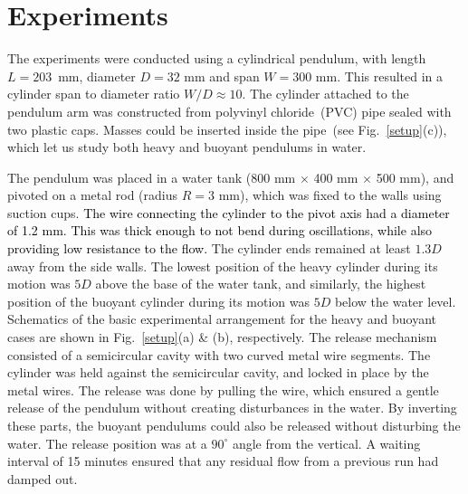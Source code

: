 \documentclass{jfm}
\begin{document}
\vspace{-.4 cm}


\section{Experiments}


The experiments were conducted using a cylindrical pendulum, with length $L = 203$~mm, diameter $D = 32$ mm and span $W = 300$ mm. This resulted in a cylinder span to diameter ratio $W/D \approx 10$. The cylinder attached to the pendulum arm was constructed from polyvinyl chloride~(PVC) pipe sealed with two plastic caps. Masses could be inserted inside the pipe~(see Fig.~\ref{setup}(c)), which let us study both heavy and buoyant pendulums in water. 





The pendulum was placed in a water tank (800 mm $\times$ 400 mm $\times$ 500 mm), and pivoted on a metal rod (radius $R = 3$ mm), which was fixed to the walls using suction cups. \textcolor{black}{The wire connecting the cylinder to the pivot axis had a diameter of 1.2 mm. This was thick enough to not bend during oscillations, while also providing low resistance to the flow.} The cylinder ends remained at least $1.3D$ away from the side walls. The lowest position of the heavy cylinder during its motion was $5D$ above the base of the water tank, and similarly, the highest position of the buoyant cylinder during its motion was $5D$ below the water level. Schematics of the basic experimental arrangement for  the heavy and buoyant cases are shown in Fig.~\ref{setup}(a) \& (b), respectively. \newline 
The release mechanism consisted of a semicircular cavity with two curved metal wire segments. The cylinder was held against the semicircular cavity, and locked in place by the metal wires. The release was done by pulling the wire, which ensured a gentle release of the pendulum without creating disturbances in the water. By inverting these parts, the buoyant pendulums could also be released without disturbing the water. The release position was at  a $90^\circ$ angle from the vertical. A waiting interval of 15 minutes ensured that any residual flow from a previous run had damped out.  
\end{document}
